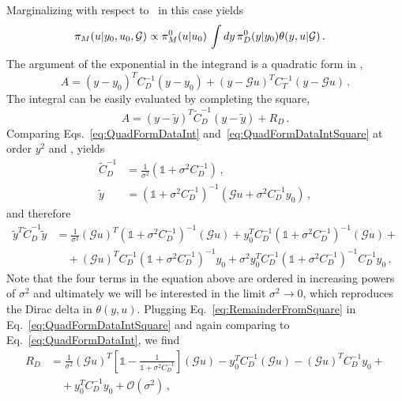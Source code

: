 Marginalizing with respect to \obs\ in this case yields 
\begin{align}
  \label{eq:MarginGaussData}
  \pi_M(u|y_0,u_0,\mathcal{G}) 
  &\propto \pi_{M}^0(u|u_0) \, 
  \int dy\, \pi_{D}^0(y|y_0) 
    \theta(y,u|\mathcal{G}) \, .
\end{align}
The argument of the exponential in the integrand is a quadratic form in \obs, 
\begin{equation}
    \label{eq:QuadFormDataInt}
    A = \left(y-y_0\right)^T C_D^{-1} \left(y-y_0\right) +
    \left(y-\mathcal{G}u\right)^T C_T^{-1} \left(y-\mathcal{G}u\right)\, .
\end{equation}
The integral can be easily evaluated by completing the square, 
\begin{equation}
    \label{eq:QuadFormDataIntSquare}
    A = \left(y-\tilde{y}\right)^T 
    \tilde{C}_D^{-1}
    \left(y-\tilde{y}\right) + R_D\, .
\end{equation}
Comparing Eqs.~\ref{eq:QuadFormDataInt} and~\ref{eq:QuadFormDataIntSquare} at order $y^2$ and \obs, yields
\begin{align}
    \tilde{C}_D^{-1} &= \frac{1}{\sigma^2}
    \left(\mathds{1} + \sigma^2 C_D^{-1}\right)\, , \\
    \tilde{y} &= \left(\mathds{1} + \sigma^2 C_D^{-1}\right)^{-1} 
    \left(
        \mathcal{G}u + \sigma^2 C_D^{-1} y_0
    \right)\, ,
\end{align}
and therefore
\begin{align}
    \tilde{y}^T \tilde{C}_D^{-1} \tilde{y}
    &= \frac{1}{\sigma^2} \left(\mathcal{G}u\right)^T
    \left(\mathds{1}+\sigma^2 C_D^{-1}\right)^{-1} \left(\mathcal{G}u\right) +
    y_0^T C_D^{-1} \left(\mathds{1}+\sigma^2 C_D^{-1}\right)^{-1} 
    \left(\mathcal{G}u\right) + \nonumber \\
    \label{eq:RemainderFromSquare}
    & \quad + \left(\mathcal{G}u\right)^T C_D^{-1} 
    \left(\mathds{1}+\sigma^2 C_D^{-1}\right)^{-1} y_0 + 
    \sigma^2 y_0^T C_D^{-1} \left(\mathds{1}+\sigma^2 C_D^{-1}\right)^{-1} 
    C_D^{-1} y_0\, .
\end{align}
Note that the four terms in the equation above are ordered in increasing powers
of $\sigma^2$ and ultimately we will be interested in the limit $\sigma^2\to 0$,
which reproduces the Dirac delta in $\theta(y,u)$. Plugging
Eq.~\ref{eq:RemainderFromSquare} in Eq.~\ref{eq:QuadFormDataIntSquare} and again
comparing to Eq.~\ref{eq:QuadFormDataInt}, we find
\begin{equation}
    \label{eq:RDBeforeLimit}  
    \begin{split}
    R_D 
    &= \frac{1}{\sigma^2} \left(\mathcal{G}u\right)^T 
    \left[
        \mathds{1} - \frac{1}{\mathds{1}+\sigma^2 C_D^{-1}} 
    \right]
    \left(\mathcal{G}u\right) - y_0^T C_D^{-1} \left(\mathcal{G}u\right)
    - \left(\mathcal{G}u\right)^T C_D^{-1} y_0 + \\ 
    & \quad + y_0^T C_D^{-1} y_0 + \mathcal{O}(\sigma^2)\, ,       
    \end{split} 
\end{equation}
